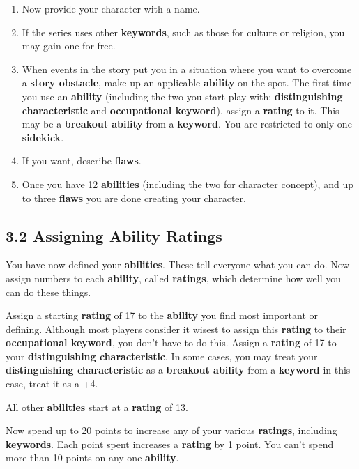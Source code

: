 \documentclass[
]{article}
\providecommand{\tightlist}{%
  \setlength{\itemsep}{0pt}\setlength{\parskip}{0pt}}
\begin{document}
\begin{enumerate}
\def\labelenumi{\arabic{enumi}.}
\setcounter{enumi}{1}
\tightlist
\item
  Now provide your character with a name.
\item
  If the series uses other \textbf{keywords}, such as those for culture
  or religion, you may gain one for free.
\item
  When events in the story put you in a situation where you want to
  overcome a \textbf{story obstacle}, make up an applicable
  \textbf{ability} on the spot. The first time you use an
  \textbf{ability} (including the two you start play with:
  \textbf{distinguishing characteristic} and \textbf{occupational
  keyword}), assign a \textbf{rating} to it. This may be a
  \textbf{breakout ability} from a \textbf{keyword}. You are restricted
  to only one \textbf{sidekick}.
\item
  If you want, describe \textbf{flaws}.
\item
  Once you have 12 \textbf{abilities} (including the two for character
  concept), and up to three \textbf{flaws} you are done creating your
  character.
\end{enumerate}

\hypertarget{assigning-ability-ratings}{%
\subsection{3.2 Assigning Ability
Ratings}\label{assigning-ability-ratings}}

You have now defined your \textbf{abilities}. These tell everyone what
you can do. Now assign numbers to each \textbf{ability}, called
\textbf{ratings}, which determine how well you can do these things.

Assign a starting \textbf{rating} of 17 to the \textbf{ability} you find
most important or defining. Although most players consider it wisest to
assign this \textbf{rating} to their \textbf{occupational keyword}, you
don't have to do this. Assign a \textbf{rating} of 17 to your
\textbf{distinguishing characteristic}. In some cases, you may treat
your \textbf{distinguishing characteristic} as a \textbf{breakout
ability} from a \textbf{keyword} in this case, treat it as a +4.

All other \textbf{abilities} start at a \textbf{rating} of 13.

Now spend up to 20 points to increase any of your various
\textbf{ratings}, including \textbf{keywords}. Each point spent
increases a \textbf{rating} by 1 point. You can't spend more than 10
points on any one \textbf{ability}.
\end{document}
